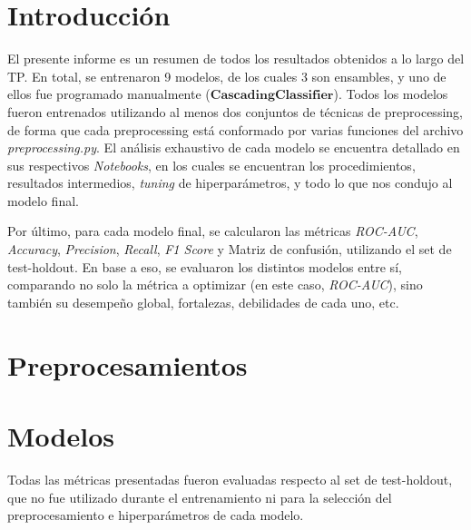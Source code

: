 \documentclass[12pt]{article}
\numberwithin{equation}{section}
\numberwithin{figure}{section}
\numberwithin{table}{section}
\begin{document}
	\tableofcontents
	\newpage
	
	\section{Introducción}
	El presente informe es un resumen de todos los resultados obtenidos a lo largo del TP.
	En total, se entrenaron 9 modelos, de los cuales 3 son ensambles, y uno de ellos fue programado manualmente
	($\textbf{CascadingClassifier}$). Todos los modelos fueron entrenados utilizando al menos dos conjuntos de técnicas de
	preprocessing, de forma que cada preprocessing está conformado por varias funciones del archivo \textit{preprocessing.py}. El análisis exhaustivo de cada modelo se encuentra detallado en sus respectivos \textit{Notebooks}, en los cuales se encuentran los procedimientos, resultados intermedios, \textit{tuning} de hiperparámetros, y todo lo que nos condujo al modelo final.
	
	Por último, para cada modelo final, se calcularon las métricas \textit{ROC-AUC}, \textit{Accuracy}, \textit{Precision},
	\textit{Recall}, \textit{F1 Score} y Matriz de confusión, utilizando el set de test-holdout.
	En base a eso, se evaluaron los distintos modelos entre sí, comparando no solo la métrica a optimizar (en este caso,
	\textit{ROC-AUC}), sino también su desempeño global, fortalezas, debilidades de cada uno, etc.
	
	
	
	
	
	\section{Preprocesamientos}
	
	\begingroup
	\fontsize{11pt}{12pt}\selectfont
	
	
	\endgroup

	\pagebreak

	\section{Modelos}
	Todas las métricas presentadas fueron evaluadas respecto al set de
	test-holdout, que no fue utilizado durante el entrenamiento ni
	para la selección del preprocesamiento e hiperparámetros de cada modelo.

	\begingroup
	\fontsize{11pt}{12pt}\selectfont
	
\end{document}
